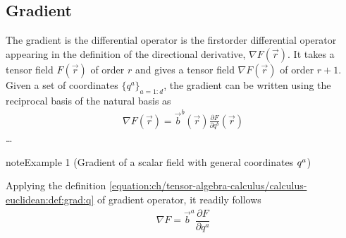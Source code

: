 \documentclass[letterpaper,10pt,english]{jupyterBook}
\begin{document}
\subsection{Gradient}
\label{\detokenize{ch/tensor-algebra-calculus/calculus-euclidean:gradient}}\label{\detokenize{ch/tensor-algebra-calculus/calculus-euclidean:tensor-calculus-differential-operators-gradient}}
\sphinxAtStartPar
The gradient is the differential operator is the first\sphinxhyphen{}order differential operator appearing in the definition of the directional derivative, \(\nabla F(\vec{r})\). It takes a tensor field \(F(\vec{r})\) of order \(r\) and gives a tensor field \(\nabla F(\vec{r})\) of order \(r+1\). Given a set of coordinates \(\{q^a\}_{a=1:d}\), the gradient can be written using the reciprocal basis of the natural basis as
\begin{equation}\label{equation:ch/tensor-algebra-calculus/calculus-euclidean:def:grad:q}
\begin{split}\nabla F(\vec{r}) = \vec{b}^b(\vec{r}) \frac{\partial F}{\partial q^b}(\vec{r})\end{split}
\end{equation}
\sphinxAtStartPar
{} …
\label{ch/tensor-algebra-calculus/calculus-euclidean:example-4}
\begin{sphinxadmonition}{note}{Example 1 (Gradient of a scalar field \sphinxhyphen{} with general coordinates \protect\(q^{a}\protect\))}



\sphinxAtStartPar
Applying the definition \eqref{equation:ch/tensor-algebra-calculus/calculus-euclidean:def:grad:q} of gradient operator, it readily follows
\begin{equation*}
\begin{split}\nabla F = \vec{b}^a \dfrac{\partial F}{\partial q^a}\end{split}
\end{equation*}\end{sphinxadmonition}
\label{ch/tensor-algebra-calculus/calculus-euclidean:example-5}
\end{document}
